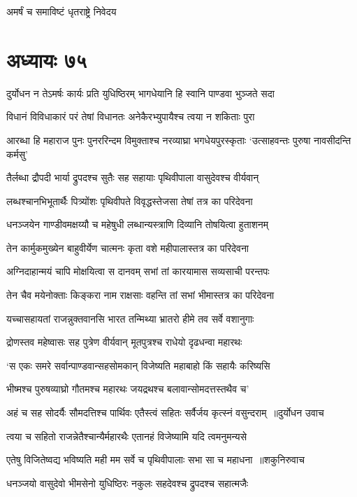 अमर्षं च समाविष्टं धृतराष्ट्रे निवेदय
\chapter{अध्यायः ७५}
\twolineshloka
{दुर्योधन न तेऽमर्षः कार्यः प्रति युधिष्ठिरम्}
{भागधेयानि हि स्वानि पाण्डवा भुञ्जते सदा}


\twolineshloka
{विधानं विविधाकारं परं तेषां विधानतः}
{अनेकैरभ्युपायैश्च त्वया न शकिताः पुरा}


\threelineshloka
{आरब्धा हि महाराज पुनः पुनररिन्दम}
{विमुक्ताश्च नरव्याघ्रा भगधेयपुरस्कृताः}
{`उत्साहवन्तः पुरुषा नावसीदन्ति कर्मसु'}


\twolineshloka
{तैर्लब्धा द्रौपदी भार्या द्रुपदश्च सुतैः सह}
{सहायाः पृथिवीपाला वासुदेवश्च वीर्यवान्}


\twolineshloka
{लब्धश्चानभिभूतार्थैः पित्र्योंशः पृथिवीपते}
{विवृद्धस्तेजसा तेषां तत्र का परिदेवना}


\twolineshloka
{धनञ्जयेन गाण्डीवमक्षय्यौ च महेषुधी}
{लब्धान्यस्त्राणि दिव्यानि तोषयित्वा हुताशनम्}


\twolineshloka
{तेन कार्मुकमुख्येन बाहुवीर्येण चात्मनः}
{कृता वशे महीपालास्तत्र का परिदेवना}


\twolineshloka
{अग्निदाहान्मयं चापि मोक्षयित्वा स दानवम्}
{सभां तां कारयामास सव्यसाची परन्तपः}


\twolineshloka
{तेन चैव मयेनोक्ताः किङ्करा नाम राक्षसाः}
{वहन्ति तां सभां भीमास्तत्र का परिदेवना}


\twolineshloka
{यच्चासहायतां राजन्नुक्तवानसि भारत}
{तन्मिथ्या भ्रातरो हीमे तव सर्वे वशानुगाः}


\twolineshloka
{द्रोणस्तव महेष्वासः सह पुत्रेण वीर्यवान्}
{मूतपुत्रश्च राधेयो दृढधन्वा महारथः}


\twolineshloka
{`स एकः समरे सर्वान्पाण्डवान्सहसोमकान्}
{विजेष्यति महाबाहो किं सहायैः करिष्यसि}


\twolineshloka
{भीष्मश्च पुरुषव्याघ्रो गौतमश्च महारथः}
{जयद्रथश्च बलावान्सोमदत्तस्तथैव च'}


\threelineshloka
{अहं च सह सोदर्यैः सौमदत्तिश्च पार्थिवः}
{एतैस्त्वं सहितः सर्वैर्जय कृत्स्नं वसुन्दराम् ॥दुर्योधन उवाच}
{}


\twolineshloka
{त्वया च सहितो राजन्नेतैश्चान्यैर्महारथैः}
{एतानहं विजेष्यामि यदि त्वमनुमन्यसे}


\twolineshloka
{एतेषु विजितेष्वद्य भविष्यति मही मम}
{सर्वे च पृथिवीपालाः सभा सा च महाधना ॥शकुनिरुवाच}


\twolineshloka
{धनञ्जयो वासुदेवो भीमसेनो युधिष्ठिरः}
{नकुलः सहदेवश्च द्रुपदश्च सहात्मजैः}


